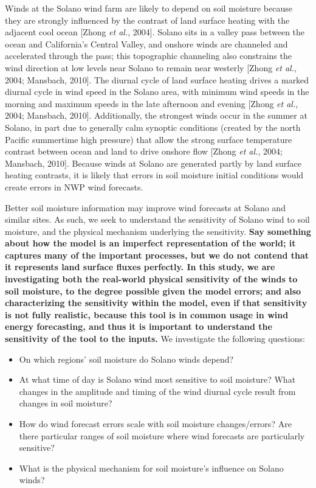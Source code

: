 Winds at the Solano wind farm are likely to depend on soil moisture because they are strongly influenced by the contrast of land surface heating with the adjacent cool ocean [Zhong \textit{et al.}, 2004].  Solano sits in a valley pass between the ocean and California's Central Valley, and onshore winds are channeled and accelerated through the pass; this topographic channeling also constrains the wind direction at low levels near Solano to remain near westerly [Zhong \textit{et al.}, 2004; Mansbach, 2010].  The diurnal cycle of land surface heating drives a marked diurnal cycle in wind speed in the Solano area, with minimum wind speeds in the morning and maximum speeds in the late afternoon and evening [Zhong \textit{et al.}, 2004; Mansbach, 2010].  Additionally, the strongest winds occur in the summer at Solano, in part due to generally calm synoptic conditions (created by the north Pacific summertime high pressure) that allow the strong surface temperature contrast between ocean and land to drive onshore flow [Zhong \textit{et al.}, 2004; Mansbach, 2010]. Because winds at Solano are generated partly by land surface heating contrasts, it is likely that errors in soil moisture initial conditions would create errors in NWP wind forecasts.

Better soil moisture information may improve wind forecasts at Solano and similar sites.  As such, we seek to understand the sensitivity of Solano wind to soil moisture, and the physical mechanism underlying the sensitivity.  \textbf{Say something about how the model is an imperfect representation of the world; it captures many of the important processes, but we do not contend that it represents land surface fluxes perfectly.  In this study, we are investigating both the real-world physical sensitivity of the winds to soil moisture, to the degree possible given the model errors; and also characterizing the sensitivity within the model, even if that sensitivity is not fully realistic, because this tool is in common usage in wind energy forecasting, and thus it is important to understand the sensitivity of the tool to the inputs.}  We investigate the following questions:
\begin{itemize}
\item On which regions' soil moisture do Solano winds depend?
\item At what time of day is Solano wind most sensitive to soil moisture?  What changes in the amplitude and timing of the wind diurnal cycle result from changes in soil moisture?
\item How do wind forecast errors scale with soil moisture changes/errors?  Are there particular ranges of soil moisture where wind forecasts are particularly sensitive?
\item What is the physical mechanism for soil moisture's influence on Solano winds?
\end{itemize}

